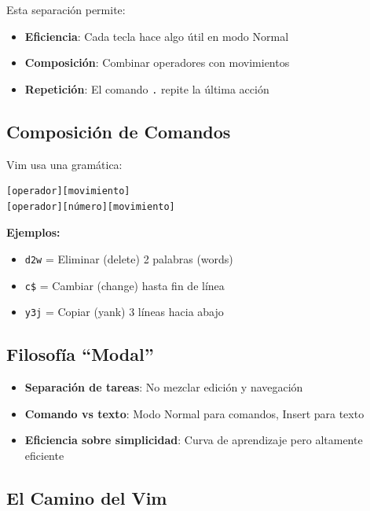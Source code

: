 \documentclass[
  doc,
  floatsintext,
  longtable,
  a4paper,
  nolmodern,
  notxfonts,
  notimes,
  12pt,
  colorlinks=true,linkcolor=blue,citecolor=blue,urlcolor=blue]{apa7}
\providecommand{\tightlist}{%
  \setlength{\itemsep}{0pt}\setlength{\parskip}{0pt}}
\begin{document}
Esta separación permite:

\begin{itemize}
\tightlist
\item
  \textbf{Eficiencia}: Cada tecla hace algo útil en modo Normal
\item
  \textbf{Composición}: Combinar operadores con movimientos
\item
  \textbf{Repetición}: El comando \texttt{.} repite la última acción
\end{itemize}

\subsection{Composición de Comandos}\label{composiciuxf3n-de-comandos}

Vim usa una gramática:

\begin{verbatim}
[operador][movimiento]
[operador][número][movimiento]
\end{verbatim}

\textbf{Ejemplos:}

\begin{itemize}
\tightlist
\item
  \texttt{d2w} = Eliminar (delete) 2 palabras (words)
\item
  \texttt{c\$} = Cambiar (change) hasta fin de línea
\item
  \texttt{y3j} = Copiar (yank) 3 líneas hacia abajo
\end{itemize}

\subsection{Filosofía ``Modal''}\label{filosofuxeda-modal-1}

\begin{itemize}
\tightlist
\item
  \textbf{Separación de tareas}: No mezclar edición y navegación
\item
  \textbf{Comando vs texto}: Modo Normal para comandos, Insert para
  texto
\item
  \textbf{Eficiencia sobre simplicidad}: Curva de aprendizaje pero
  altamente eficiente
\end{itemize}

\subsection{El Camino del Vim}\label{el-camino-del-vim}
\end{document}
